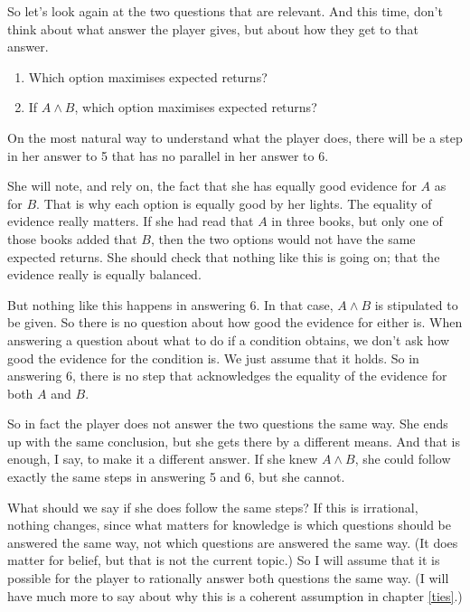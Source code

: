 \documentclass[11pt,]{book}
\providecommand{\tightlist}{%
  \setlength{\itemsep}{0pt}\setlength{\parskip}{0pt}}
\begin{document}
So let's look again at the two questions that are relevant. And this time, don't think about what answer the player gives, but about how they get to that answer.

\begin{enumerate}
\def\labelenumi{\arabic{enumi}.}
\setcounter{enumi}{4}
\tightlist
\item
  Which option maximises expected returns?
\item
  If \(A \wedge B\), which option maximises expected returns?
\end{enumerate}

On the most natural way to understand what the player does, there will be a step in her answer to 5 that has no parallel in her answer to 6.

She will note, and rely on, the fact that she has equally good evidence for \(A\) as for \(B\). That is why each option is equally good by her lights. The equality of evidence really matters. If she had read that \(A\) in three books, but only one of those books added that \(B\), then the two options would not have the same expected returns. She should check that nothing like this is going on; that the evidence really is equally balanced.

But nothing like this happens in answering 6. In that case, \(A \wedge B\) is stipulated to be given. So there is no question about how good the evidence for either is. When answering a question about what to do if a condition obtains, we don't ask how good the evidence for the condition is. We just assume that it holds. So in answering 6, there is no step that acknowledges the equality of the evidence for both \(A\) and \(B\).

So in fact the player does not answer the two questions the same way. She ends up with the same conclusion, but she gets there by a different means. And that is enough, I say, to make it a different answer. If she knew \(A \wedge B\), she could follow exactly the same steps in answering 5 and 6, but she cannot.

What should we say if she does follow the same steps? If this is irrational, nothing changes, since what matters for knowledge is which questions should be answered the same way, not which questions are answered the same way. (It does matter for belief, but that is not the current topic.) So I will assume that it is possible for the player to rationally answer both questions the same way. (I will have much more to say about why this is a coherent assumption in chapter \ref{ties}.)
\end{document}
